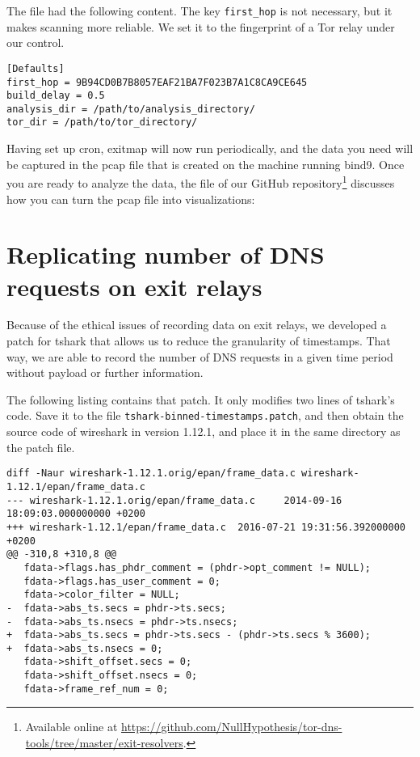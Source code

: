 \documentclass{article}
\begin{document}
The file  had the following content.  The key {\tt first\_hop}
is not necessary, but it makes scanning more reliable.  We set it to the
fingerprint of a Tor relay under our control.
\begin{lstlisting}
[Defaults]
first_hop = 9B94CD0B7B8057EAF21BA7F023B7A1C8CA9CE645
build_delay = 0.5
analysis_dir = /path/to/analysis_directory/
tor_dir = /path/to/tor_directory/
\end{lstlisting}

Having set up cron, exitmap will now run periodically, and the data you need
will be captured in the pcap file that is created on the machine running bind9.
Once you are ready to analyze the data, the  file of our GitHub
repository\footnote{Available online at
\url{https://github.com/NullHypothesis/tor-dns-tools/tree/master/exit-resolvers}.}
discusses how you can turn the pcap file into visualizations:

\section{Replicating number of DNS requests on exit relays}
Because of the ethical issues of recording data on exit relays, we developed a
patch for tshark that allows us to reduce the granularity of timestamps.  That
way, we are able to record the number of DNS requests in a given time period
without payload or further information.

The following listing contains that patch.  It only modifies two lines of
tshark's code.  Save it to the file {\tt tshark-binned-timestamps.patch}, and
then obtain the source code of wireshark in version 1.12.1, and place it in the
same directory as the patch file.

\begin{lstlisting}
diff -Naur wireshark-1.12.1.orig/epan/frame_data.c wireshark-1.12.1/epan/frame_data.c
--- wireshark-1.12.1.orig/epan/frame_data.c     2014-09-16 18:09:03.000000000 +0200
+++ wireshark-1.12.1/epan/frame_data.c  2016-07-21 19:31:56.392000000 +0200
@@ -310,8 +310,8 @@
   fdata->flags.has_phdr_comment = (phdr->opt_comment != NULL);
   fdata->flags.has_user_comment = 0;
   fdata->color_filter = NULL;
-  fdata->abs_ts.secs = phdr->ts.secs;
-  fdata->abs_ts.nsecs = phdr->ts.nsecs;
+  fdata->abs_ts.secs = phdr->ts.secs - (phdr->ts.secs % 3600);
+  fdata->abs_ts.nsecs = 0;
   fdata->shift_offset.secs = 0;
   fdata->shift_offset.nsecs = 0;
   fdata->frame_ref_num = 0;
\end{lstlisting}
\end{document}
